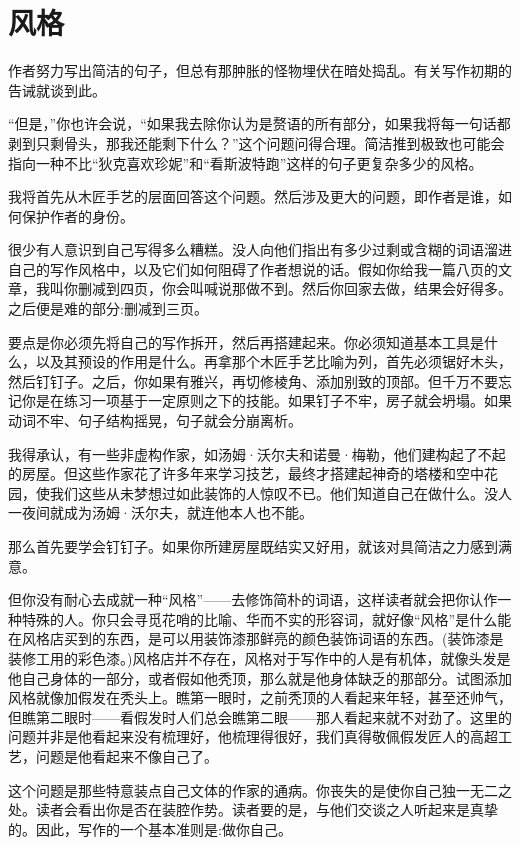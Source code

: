 \chapter{风格}
作者努力写出简洁的句子，但总有那肿胀的怪物埋伏在暗处捣乱。有关写作初期的告诫就谈到此。

“但是，”你也许会说，“如果我去除你认为是赘语的所有部分，如果我将每一句话都剥到只剩骨头，那我还能剩下什么？”这个问题问得合理。简洁推到极致也可能会指向一种不比“狄克喜欢珍妮”和“看斯波特跑”这样的句子更复杂多少的风格。

我将首先从木匠手艺的层面回答这个问题。然后涉及更大的问题，即作者是谁，如何保护作者的身份。

很少有人意识到自己写得多么糟糕。没人向他们指出有多少过剩或含糊的词语溜进自己的写作风格中，以及它们如何阻碍了作者想说的话。假如你给我一篇八页的文章，我叫你删减到四页，你会叫喊说那做不到。然后你回家去做，结果会好得多。之后便是难的部分:删减到三页。

要点是你必须先将自己的写作拆开，然后再搭建起来。你必须知道基本工具是什么，以及其预设的作用是什么。再拿那个木匠手艺比喻为列，首先必须锯好木头，然后钉钉子。之后，你如果有雅兴，再切修棱角、添加别致的顶部。但千万不要忘记你是在练习一项基于一定原则之下的技能。如果钉子不牢，房子就会坍塌。如果动词不牢、句子结构摇晃，句子就会分崩离析。

我得承认，有一些非虚构作家，如汤姆·沃尔夫和诺曼·梅勒，他们建构起了不起的房屋。但这些作家花了许多年来学习技艺，最终才搭建起神奇的塔楼和空中花园，使我们这些从未梦想过如此装饰的人惊叹不已。他们知道自己在做什么。没人一夜间就成为汤姆·沃尔夫，就连他本人也不能。

那么首先要学会钉钉子。如果你所建房屋既结实又好用，就该对具简洁之力感到满意。

但你没有耐心去成就一种“风格”——去修饰简朴的词语，这样读者就会把你认作一种特殊的人。你只会寻觅花哨的比喻、华而不实的形容词，就好像“风格”是什么能在风格店买到的东西，是可以用装饰漆那鲜亮的颜色装饰词语的东西。(装饰漆是装修工用的彩色漆。)风格店并不存在，风格对于写作中的人是有机体，就像头发是他自己身体的一部分，或者假如他秃顶，那么就是他身体缺乏的那部分。试图添加风格就像加假发在秃头上。瞧第一眼时，之前秃顶的人看起来年轻，甚至还帅气，但瞧第二眼时——看假发时人们总会瞧第二眼——那人看起来就不对劲了。这里的问题并非是他看起来没有梳理好，他梳理得很好，我们真得敬佩假发匠人的高超工艺，问题是他看起来不像自己了。

这个问题是那些特意装点自己文体的作家的通病。你丧失的是使你自己独一无二之处。读者会看出你是否在装腔作势。读者要的是，与他们交谈之人听起来是真挚的。因此，写作的一个基本准则是:做你自己。

